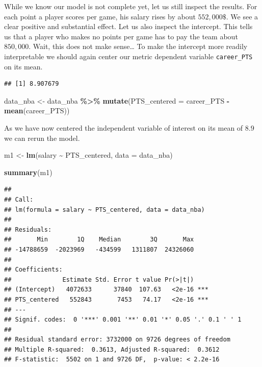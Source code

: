 \documentclass[
]{book}
\newenvironment{Shaded}{\begin{snugshade}}{\end{snugshade}}
\newcommand{\AttributeTok}[1]{\textcolor[rgb]{0.13,0.29,0.53}{#1}}
\newcommand{\FunctionTok}[1]{\textcolor[rgb]{0.13,0.29,0.53}{\textbf{#1}}}
\newcommand{\NormalTok}[1]{#1}
\newcommand{\OtherTok}[1]{\textcolor[rgb]{0.56,0.35,0.01}{#1}}
\newcommand{\SpecialCharTok}[1]{\textcolor[rgb]{0.81,0.36,0.00}{\textbf{#1}}}
\begin{document}
While we know our model is not complete yet, let us still inspect the results.
For each point a player scores per game, his salary rises by about \(552,000\$\).
We see a clear positive and substantial effect. Let us also inspect the
intercept. This tells us that a player who makes no points per game has to pay
the team about \(850,000\). Wait, this does not make sense\ldots{}
To make the intercept more readily interpretable we should again center our
metric dependent variable \texttt{career\_PTS} on its mean.

\begin{Shaded}
\end{Shaded}

\begin{verbatim}
## [1] 8.907679
\end{verbatim}

\begin{Shaded}
\begin{Highlighting}[]
\NormalTok{data\_nba }\OtherTok{\textless{}{-}}\NormalTok{ data\_nba }\SpecialCharTok{\%\textgreater{}\%} 
  \FunctionTok{mutate}\NormalTok{(}\AttributeTok{PTS\_centered =}\NormalTok{ career\_PTS }\SpecialCharTok{{-}} \FunctionTok{mean}\NormalTok{(career\_PTS))}
\end{Highlighting}
\end{Shaded}

As we have now centered the independent variable of interest on its mean of \(8.9\)
we can rerun the model.

\begin{Shaded}
\begin{Highlighting}[]
\NormalTok{m1 }\OtherTok{\textless{}{-}} \FunctionTok{lm}\NormalTok{(salary }\SpecialCharTok{\textasciitilde{}}\NormalTok{ PTS\_centered, }\AttributeTok{data =}\NormalTok{ data\_nba)}

\FunctionTok{summary}\NormalTok{(m1)}
\end{Highlighting}
\end{Shaded}

\begin{verbatim}
## 
## Call:
## lm(formula = salary ~ PTS_centered, data = data_nba)
## 
## Residuals:
##       Min        1Q    Median        3Q       Max 
## -14788659  -2023969   -434599   1311807  24326060 
## 
## Coefficients:
##              Estimate Std. Error t value Pr(>|t|)    
## (Intercept)   4072633      37840  107.63   <2e-16 ***
## PTS_centered   552843       7453   74.17   <2e-16 ***
## ---
## Signif. codes:  0 '***' 0.001 '**' 0.01 '*' 0.05 '.' 0.1 ' ' 1
## 
## Residual standard error: 3732000 on 9726 degrees of freedom
## Multiple R-squared:  0.3613, Adjusted R-squared:  0.3612 
## F-statistic:  5502 on 1 and 9726 DF,  p-value: < 2.2e-16
\end{verbatim}
\end{document}
